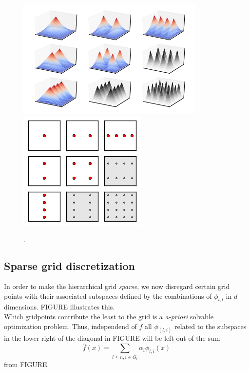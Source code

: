 

\begin{figure}[t!]
  \centering
  \includegraphics{images/figure_2.png}
  \hspace{0cm}
  \includegraphics{images/figure_3.png}
  \caption{.\label{fig:fig2}}
\end{figure}

\subsection{Sparse grid discretization}
In order to make the hierarchical grid \emph{sparse}, we now disregard certain
grid points with their associated subspaces defined by the
combinations of $\phi_{i,l}$ in $d$ dimensions. FIGURE illustrates this. \\
Which gridpoints contribute the least to the grid is a \emph{a-priori}
solvable optimization problem. Thus, independend of $f$ all $\phi_{(l,i)}$
related to the subspaces in the
lower right of the diagonal in FIGURE will be left out of the sum
$$\hat{f}(x) =  \sum_{l \leq n, i \in G_l}{\alpha_i\phi_{l,i}(x)}$$
from FIGURE.

